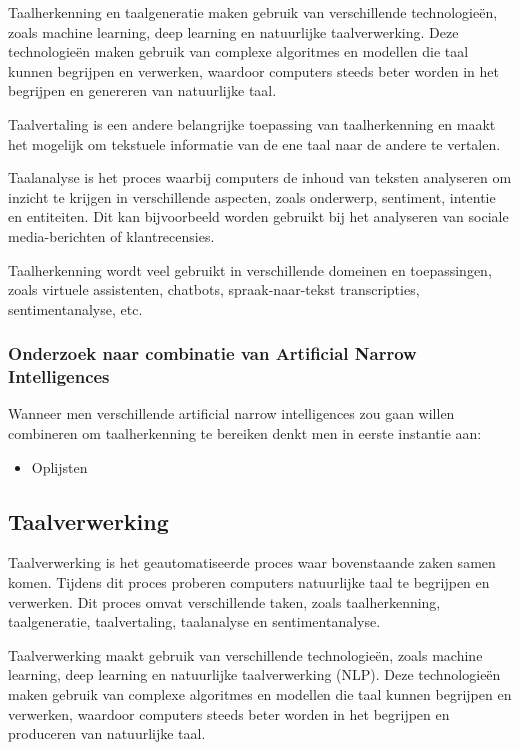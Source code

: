Taalherkenning en taalgeneratie maken gebruik van verschillende technologieën, zoals machine learning, deep learning en natuurlijke taalverwerking. Deze technologieën maken gebruik van complexe algoritmes en modellen die taal kunnen begrijpen en verwerken, waardoor computers steeds beter worden in het begrijpen en genereren van natuurlijke taal.

Taalvertaling is een andere belangrijke toepassing van taalherkenning en maakt het mogelijk om tekstuele informatie van de ene taal naar de andere te vertalen.

Taalanalyse is het proces waarbij computers de inhoud van teksten analyseren om inzicht te krijgen in verschillende aspecten, zoals onderwerp, sentiment, intentie en entiteiten. Dit kan bijvoorbeeld worden gebruikt bij het analyseren van sociale media-berichten of klantrecensies.

Taalherkenning wordt veel gebruikt in verschillende domeinen en toepassingen, zoals virtuele assistenten, chatbots, spraak-naar-tekst transcripties, sentimentanalyse, etc.

\subsubsection{Onderzoek naar combinatie van Artificial Narrow Intelligences}

Wanneer men verschillende artificial narrow intelligences zou gaan willen combineren om taalherkenning te bereiken denkt men in eerste instantie aan:

\begin{itemize}
    \item Oplijsten
\end{itemize}

\subsection{Taalverwerking}

Taalverwerking is het geautomatiseerde proces waar bovenstaande zaken samen komen. Tijdens dit proces proberen computers natuurlijke taal te begrijpen en verwerken. Dit proces omvat verschillende taken, zoals taalherkenning, taalgeneratie, taalvertaling, taalanalyse en sentimentanalyse.

Taalverwerking maakt gebruik van verschillende technologieën, zoals machine learning, deep learning en natuurlijke taalverwerking (NLP). Deze technologieën maken gebruik van complexe algoritmes en modellen die taal kunnen begrijpen en verwerken, waardoor computers steeds beter worden in het begrijpen en produceren van natuurlijke taal. 

